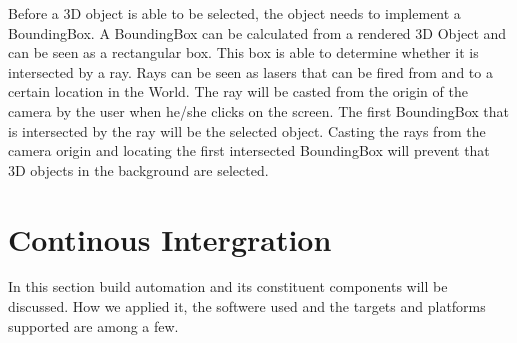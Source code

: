 \documentclass[10pt]{extarticle} %
\begin{document}
    Before a 3D object is able to be selected, the object needs to implement a BoundingBox.
    A BoundingBox can be calculated from a rendered 3D Object and can be seen as a rectangular box.
    This box is able to determine whether it is intersected by a ray.
    Rays can be seen as lasers that can be fired from and to a certain location in the World.
    The ray will be casted from the origin of the camera by the user when he/she clicks on the screen.
    The first BoundingBox that is intersected by the ray will be the selected object.
    Casting the rays from the camera origin and locating the first intersected BoundingBox will prevent that 3D objects in the background are selected.

    \newpage
    \section{Continous Intergration}
    In this section build automation and its constituent components will be discussed.
    How we applied it, the softwere used and the targets and platforms supported are among a few.

    \newpage
    
\end{document}
